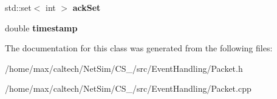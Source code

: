 \begin{DoxyCompactItemize}
\item 
\hypertarget{classPacket_ab196846302b6d54c4b3a417308f34819}{std\-::set$<$ int $>$ {\bfseries ack\-Set}}\label{classPacket_ab196846302b6d54c4b3a417308f34819}

\item 
\hypertarget{classPacket_a3c6b8af8bd18da132511da84aaba3acb}{double {\bfseries timestamp}}\label{classPacket_a3c6b8af8bd18da132511da84aaba3acb}

\end{DoxyCompactItemize}


\-The documentation for this class was generated from the following files\-:\begin{DoxyCompactItemize}
\item 
/home/max/caltech/\-Net\-Sim/\-C\-S\-\_/src/\-Event\-Handling/\-Packet.\-h\item 
/home/max/caltech/\-Net\-Sim/\-C\-S\-\_/src/\-Event\-Handling/\-Packet.\-cpp\end{DoxyCompactItemize}
